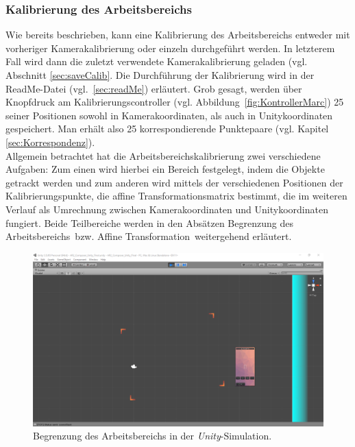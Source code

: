 \subsubsection{Kalibrierung des Arbeitsbereichs}\label{sec:planeCalib} 
Wie bereits beschrieben, kann eine Kalibrierung des Arbeitsbereichs entweder mit vorheriger Kamerakalibrierung oder einzeln durchgeführt werden. In letzterem Fall wird dann die zuletzt verwendete Kamerakalibrierung geladen (vgl. Abschnitt \ref{sec:saveCalib}. Die Durchführung der Kalibrierung wird in der ReadMe-Datei (vgl.~\ref{sec:readMe}) erläutert. Grob gesagt, werden über Knopfdruck am Kalibrierungscontroller (vgl. Abbildung~\ref{fig:KontrollerMarc}) 25 seiner Positionen sowohl in Kamerakoordinaten, als auch in Unitykoordinaten gespeichert. Man erhält also 25 korrespondierende Punktepaare (vgl. Kapitel \ref{sec:Korrespondenz}).\\
Allgemein betrachtet hat die Arbeitsbereichskalibrierung zwei verschiedene Aufgaben: Zum einen wird hierbei ein Bereich festgelegt, indem die Objekte getrackt werden und zum anderen wird mittels der verschiedenen Positionen der Kalibrierungspunkte, die affine Transformationsmatrix bestimmt, die im weiteren Verlauf als Umrechnung zwischen Kamerakoordinaten und Unitykoordinaten fungiert. Beide Teilbereiche werden in den Absätzen \grqq Begrenzung des Arbeitsbereichs\grqq ~bzw. \grqq Affine Transformation\grqq ~weitergehend erläutert.

\begin{figure}
	\centering
	\includegraphics[width=\textwidth, trim=7cm 2cm 5cm 6cm, clip]{Bilder/Neue Screenshots/Arbeitsbereich.PNG}
	\caption{Begrenzung des Arbeitsbereichs in der \emph{Unity}-Simulation.}
	\label{fig:begrenzungArbeitsbereich}
\end{figure}

